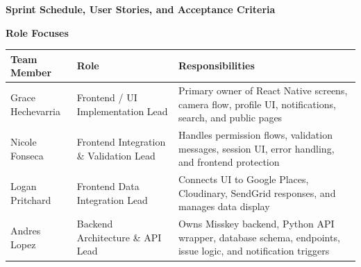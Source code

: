 \documentclass[11pt]{article}
\begin{document}
\begin{center}
    {\Large\bfseries Sprint Schedule, User Stories, and Acceptance Criteria}
\end{center}

\vspace{0.5em}

\begin{center}
    {\large\bfseries Role Focuses}
\end{center}

\vspace{0.3em}

\noindent
\begin{tabular}{|L{3cm}|L{4.5cm}|L{7.5cm}|}
\hline
\textbf{Team Member} & \textbf{Role} & \textbf{Responsibilities} \\
\hline
Grace Hechevarria & Frontend / UI Implementation Lead & Primary owner of React Native screens, camera flow, profile UI, notifications, search, and public pages \\
\hline
Nicole Fonseca & Frontend Integration \& Validation Lead & Handles permission flows, validation messages, session UI, error handling, and frontend protection \\
\hline
Logan Pritchard & Frontend Data Integration Lead & Connects UI to Google Places, Cloudinary, SendGrid responses, and manages data display \\
\hline
Andres Lopez & Backend Architecture \& API Lead & Owns Misskey backend, Python API wrapper, database schema, endpoints, issue logic, and notification triggers \\
\hline
\end{tabular}

\vspace{2em}


\vspace{0.5em}
\end{document}
